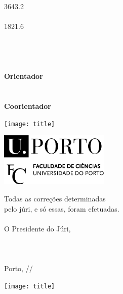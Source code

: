 \documentclass[11pt]{article}
\makeatletter
\newcommand\HUGE{\@setfontsize\Huge{36}{43.2}}
\newcommand\LargeA{\@setfontsize\Large{18}{21.6}}
\makeatother
\begin{document}
\pagestyle{empty}
\setlength{\parindent}{0cm}



\hspace{25mm}
\begin{minipage}[b][297mm][t]{125mm}
	\vfill
	\parbox[t][200mm][t]{125mm}{
		\raggedright
		{\HUGE \bfseries \fronttitle} \\
		 {\large~\\}
		{\LargeA \authorname \\} 
		{\large \coursename \\}
		{\small \deptname \\ \the\year \\}
		{\small~\\}
		{\large \bfseries Orientador \\}
		{\small \supervisor \\}
		{\small~\\}
		{\large \bfseries Coorientador \\}
		{\small \cosupervisor}
	}
\end{minipage}
\hfill
\begin{minipage}[b][297mm][b]{54.3mm}
	\texttt{[image: title]}
\end{minipage}



\raggedleft
\begin{minipage}[b][297mm][b]{54.3mm}
	\includegraphics[width=52mm]{fcup}

	
	{ \noindent\footnotesize Todas as correções determinadas \\
		pelo júri, e só essas, foram efetuadas. \\
		\\
		O Presidente do Júri, \\
		\\ 
		\\
		\\
		Porto, \underline{\qquad\quad}/\underline{\quad\qquad}/\underline{\qquad\qquad} \\
	}


	\texttt{[image: title]}
\end{minipage}
\end{document}
